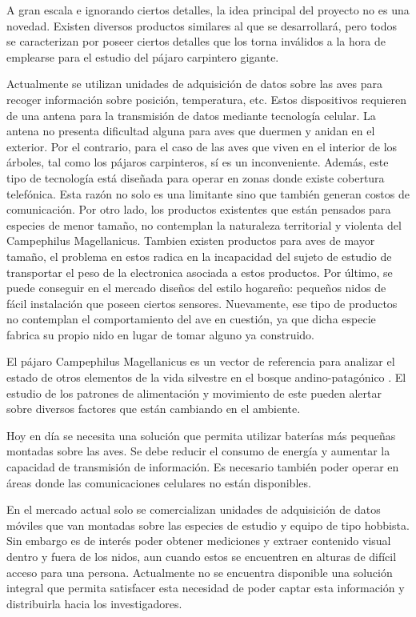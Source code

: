 %

%


A gran escala e ignorando ciertos detalles, la idea principal del proyecto no es una novedad. Existen diversos productos similares al que se desarrollará, pero todos se caracterizan por poseer ciertos detalles que los torna inválidos a la hora de emplearse para el estudio del pájaro carpintero gigante.

Actualmente se utilizan unidades de adquisición de datos sobre las aves para recoger información sobre posición, temperatura, etc. Estos dispositivos requieren de una antena para la transmisión de datos mediante tecnología celular. La antena no presenta dificultad alguna para aves que duermen y anidan en el exterior. Por el contrario, para el caso de las aves que viven en el interior de los árboles, tal como los pájaros carpinteros, sí es un inconveniente. Además, este tipo de tecnología está diseñada para operar en zonas donde existe cobertura telefónica. Esta razón no solo es una limitante sino que también generan costos de comunicación. Por otro lado, los productos existentes que están pensados para especies de menor tamaño, no contemplan la naturaleza territorial y violenta del Campephilus Magellanicus.
Tambien existen productos para aves de mayor tamaño, el problema en estos radica en la incapacidad del sujeto de estudio de transportar el peso de la electronica asociada a estos productos.
Por último, se puede conseguir en el mercado diseños del estilo hogareño: pequeños nidos de fácil instalación que poseen ciertos sensores. Nuevamente, ese tipo de productos no contemplan el comportamiento del ave en cuestión, ya que dicha especie fabrica su propio nido en lugar de tomar alguno ya construido.


El pájaro Campephilus Magellanicus es un vector de referencia para analizar el estado de otros elementos de la vida silvestre en el bosque andino-patagónico \cite{ref:PaperValeriaOjeda}. El estudio de los patrones de alimentación y movimiento de este pueden alertar sobre diversos factores que están cambiando en el ambiente.

Hoy en día se necesita una solución que permita utilizar baterías más pequeñas montadas sobre las aves. Se debe reducir el consumo de energía y aumentar la capacidad de transmisión de información. Es necesario también poder operar en áreas donde las comunicaciones celulares no están disponibles.

En el mercado actual solo se comercializan unidades de adquisición de datos móviles que van montadas sobre las especies de estudio y equipo de tipo hobbista. Sin embargo es de interés poder obtener mediciones y extraer contenido visual dentro y fuera de los nidos, aun cuando estos se encuentren en alturas de difícil acceso para una persona. Actualmente no se encuentra disponible una solución integral que permita satisfacer esta necesidad de poder captar esta información y distribuirla hacia los investigadores.

%
